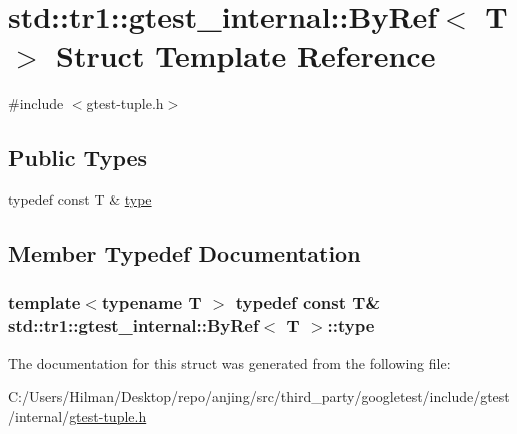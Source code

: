 \hypertarget{structstd_1_1tr1_1_1gtest__internal_1_1_by_ref}{}\section{std\+:\+:tr1\+:\+:gtest\+\_\+internal\+:\+:By\+Ref$<$ T $>$ Struct Template Reference}
\label{structstd_1_1tr1_1_1gtest__internal_1_1_by_ref}


{\ttfamily \#include $<$gtest-\/tuple.\+h$>$}

\subsection*{Public Types}
\begin{DoxyCompactItemize}
\item 
typedef const T \& \hyperlink{structstd_1_1tr1_1_1gtest__internal_1_1_by_ref_ac42ad942ee1cfa86b2abcce9b88ac10e}{type}
\end{DoxyCompactItemize}


\subsection{Member Typedef Documentation}
\hypertarget{structstd_1_1tr1_1_1gtest__internal_1_1_by_ref_ac42ad942ee1cfa86b2abcce9b88ac10e}{}
\subsubsection[{type}]{\setlength{\rightskip}{0pt plus 5cm}template$<$typename T $>$ typedef const T\& {\bf std\+::tr1\+::gtest\+\_\+internal\+::\+By\+Ref}$<$ T $>$\+::{\bf type}}\label{structstd_1_1tr1_1_1gtest__internal_1_1_by_ref_ac42ad942ee1cfa86b2abcce9b88ac10e}


The documentation for this struct was generated from the following file\+:\begin{DoxyCompactItemize}
\item 
C\+:/\+Users/\+Hilman/\+Desktop/repo/anjing/src/third\+\_\+party/googletest/include/gtest/internal/\hyperlink{gtest-tuple_8h}{gtest-\/tuple.\+h}\end{DoxyCompactItemize}
